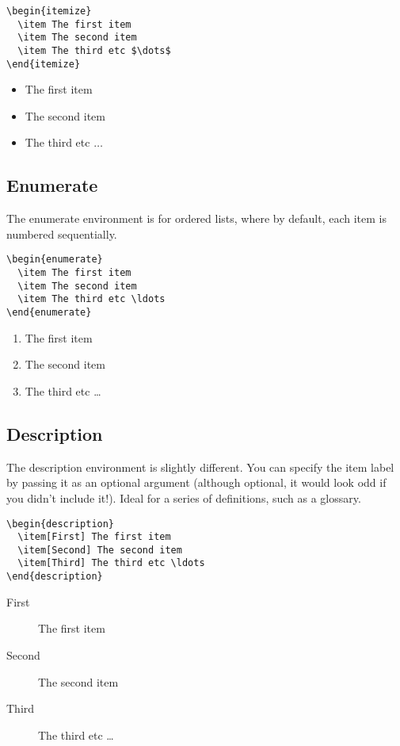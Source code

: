 \begin{lstlisting}
\begin{itemize}
  \item The first item
  \item The second item
  \item The third etc $\dots$
\end{itemize}
\end{lstlisting} 
\begin{itemize}
\item The first item
\item The second item
\item The third etc $\dots$
\end{itemize}

\subsection{Enumerate}
The enumerate environment is for ordered lists, where by default, each item is
numbered sequentially.

\begin{lstlisting}
\begin{enumerate}
  \item The first item
  \item The second item
  \item The third etc \ldots
\end{enumerate}
\end{lstlisting}
\begin{enumerate}
  \item The first item
  \item The second item
  \item The third etc \ldots
\end{enumerate}

\subsection{Description}
The description environment is slightly different. You can specify the item
label by passing it as an optional argument (although optional, it would look
odd if you didn't include it!). Ideal for a series of definitions, such as a
glossary.

\begin{lstlisting}
\begin{description}
  \item[First] The first item
  \item[Second] The second item
  \item[Third] The third etc \ldots
\end{description}
\end{lstlisting}
\begin{description}
  \item[First] The first item
  \item[Second] The second item
  \item[Third] The third etc \ldots
\end{description}

